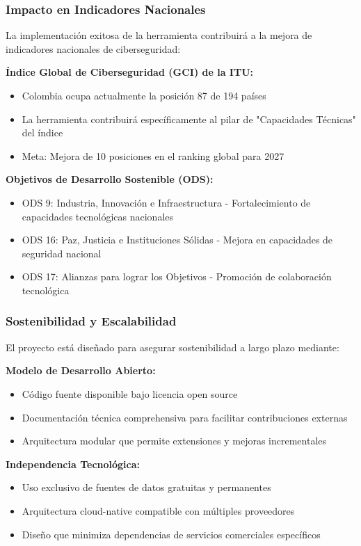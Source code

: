 \subsubsection{Impacto en Indicadores Nacionales}
La implementación exitosa de la herramienta contribuirá a la mejora de indicadores nacionales de ciberseguridad:

\textbf{Índice Global de Ciberseguridad (GCI) de la ITU:}
\begin{itemize}
    \item Colombia ocupa actualmente la posición 87 de 194 países
    \item La herramienta contribuirá específicamente al pilar de "Capacidades Técnicas" del índice
    \item Meta: Mejora de 10 posiciones en el ranking global para 2027
\end{itemize}

\textbf{Objetivos de Desarrollo Sostenible (ODS):}
\begin{itemize}
    \item ODS 9: Industria, Innovación e Infraestructura - Fortalecimiento de capacidades tecnológicas nacionales
    \item ODS 16: Paz, Justicia e Instituciones Sólidas - Mejora en capacidades de seguridad nacional
    \item ODS 17: Alianzas para lograr los Objetivos - Promoción de colaboración tecnológica
\end{itemize}

\subsubsection{Sostenibilidad y Escalabilidad}
El proyecto está diseñado para asegurar sostenibilidad a largo plazo mediante:

\textbf{Modelo de Desarrollo Abierto:}
\begin{itemize}
    \item Código fuente disponible bajo licencia open source
    \item Documentación técnica comprehensiva para facilitar contribuciones externas
    \item Arquitectura modular que permite extensiones y mejoras incrementales
\end{itemize}

\textbf{Independencia Tecnológica:}
\begin{itemize}
    \item Uso exclusivo de fuentes de datos gratuitas y permanentes
    \item Arquitectura cloud-native compatible con múltiples proveedores
    \item Diseño que minimiza dependencias de servicios comerciales específicos
\end{itemize}

